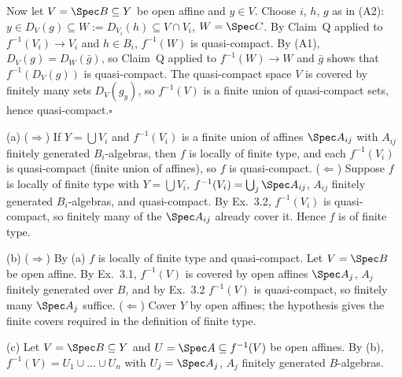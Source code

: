\documentclass[11pt]{article}
\begin{document}
Now let $V=\Spec B\subseteq Y$ be open affine and $y\in V$. Choose $i$, $h$, $g$ as in (A2): $y\in D_V(g)\subseteq W:=D_{V_i}(h)\subseteq V\cap V_i$, $W=\Spec C$. By Claim~Q applied to $f^{-1}(V_i)\to V_i$ and $h\in B_i$, $f^{-1}(W)$ is quasi-compact. By (A1), $D_V(g)=D_W(\bar g)$, so Claim~Q applied to $f^{-1}(W)\to W$ and $\bar g$ shows that $f^{-1}(D_V(g))$ is quasi-compact. The quasi-compact space $V$ is covered by finitely many sets $D_V(g_y)$, so $f^{-1}(V)$ is a finite union of quasi-compact sets, hence quasi-compact.\hfill$\square$

\pf
(a) ($\Rightarrow$) If $Y=\bigcup V_i$ and $f^{-1}(V_i)$ is a finite union of affines $\Spec A_{ij}$ with $A_{ij}$ finitely generated $B_i$-algebras, then $f$ is locally of finite type, and each $f^{-1}(V_i)$ is quasi-compact (finite union of affines), so $f$ is quasi-compact. ($\Leftarrow$) Suppose $f$ is locally of finite type with $Y=\bigcup V_i$, $f^{-1}(V_i)=\bigcup_j\Spec A_{ij}$, $A_{ij}$ finitely generated $B_i$-algebras, and quasi-compact. By Ex.~3.2, $f^{-1}(V_i)$ is quasi-compact, so finitely many of the $\Spec A_{ij}$ already cover it. Hence $f$ is of finite type.

(b) ($\Rightarrow$) By (a) $f$ is locally of finite type and quasi-compact. Let $V=\Spec B$ be open affine. By Ex.~3.1, $f^{-1}(V)$ is covered by open affines $\Spec A_j$, $A_j$ finitely generated over $B$, and by Ex.~3.2 $f^{-1}(V)$ is quasi-compact, so finitely many $\Spec A_j$ suffice. ($\Leftarrow$) Cover $Y$ by open affines; the hypothesis gives the finite covers required in the definition of finite type.

(c) Let $V=\Spec B\subseteq Y$ and $U=\Spec A\subseteq f^{-1}(V)$ be open affines. By (b), $f^{-1}(V)=U_1\cup\dots\cup U_n$ with $U_j=\Spec A_j$, $A_j$ finitely generated $B$-algebras.
\end{document}
